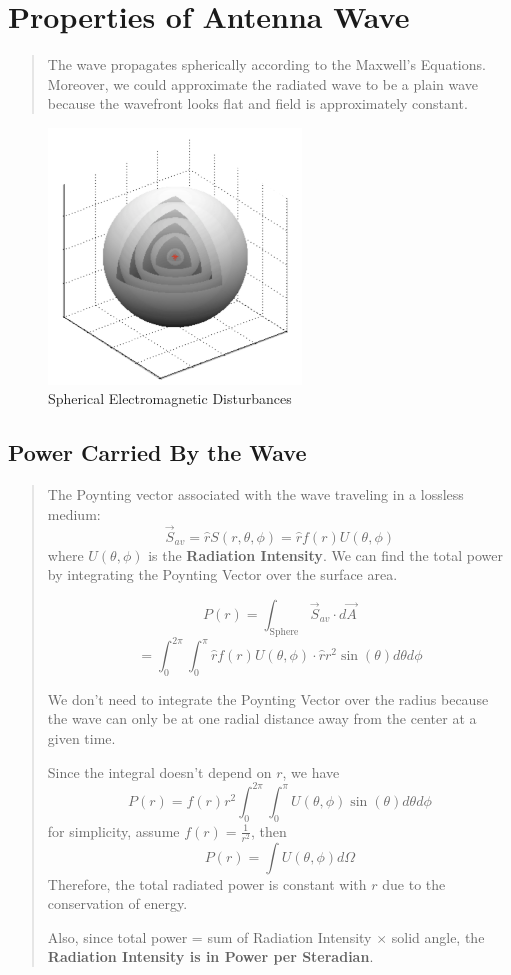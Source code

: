\documentclass{article} %
\begin{document}
\section{Properties of Antenna Wave}
\begin{quote}
    The wave propagates spherically according to the Maxwell's Equations. Moreover, we could approximate the radiated wave to be a plain wave because the wavefront looks flat and field is approximately constant.
\end{quote}
\begin{figure}[H]
    \centering
    \includegraphics[width=0.6\textwidth]{./image/figure2.png}
    \caption{Spherical Electromagnetic Disturbances}
\end{figure}
\subsection{Power Carried By the Wave}
\begin{quote}
    The Poynting vector associated with the wave traveling in a lossless medium:
    \[\vec{S}_{av} = \hat{r} S(r, \theta, \phi) = \hat{r} f(r) U(\theta, \phi)\]
    where $U(\theta, \phi)$ is the \textbf{Radiation Intensity}.
    \smallskip
    We can find the total power by integrating the Poynting Vector over the surface area.

    \[P(r) = \int_{\text{Sphere}} \vec{S}_{av} \cdot d\vec{A}\]
    \[= \int_{0}^{2\pi} \int_{0}^{\pi} \hat{r} f(r)U(\theta, \phi) \cdot \hat{r} r^2 \sin(\theta) d\theta d\phi\]

    We don't need to integrate the Poynting Vector over the radius because the wave can only be at one radial distance away from the center at a given time.

    Since the integral doesn't depend on $r$, we have
    \[P(r) = f(r) r^2 \int_{0}^{2\pi} \int_{0}^{\pi} U(\theta, \phi) \sin(\theta) d\theta d\phi\]
    for simplicity, assume $f(r) = \frac{1}{r^2}$, then
    \[P(r) = \int U(\theta, \phi) d\Omega\]
    Therefore, the total radiated power is constant with $r$ due to the conservation of energy.

    Also, since total power = sum of Radiation Intensity $\times$ solid angle, the \textbf{Radiation Intensity is in Power per Steradian}.
\end{quote}
\end{document}
